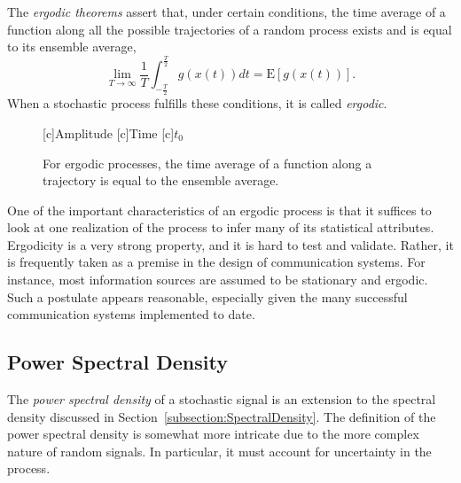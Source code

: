 \begin{definition}[Ergodicity]
The \emph{ergodic theorems} assert that, under certain conditions, the time average of a function along all the possible trajectories of a random process exists and is equal to its ensemble average,
\begin{equation*}
\lim_{T \rightarrow \infty} \frac{1}{T} \int_{- \frac{T}{2}}^{\frac{T}{2}} g(x(t)) dt
= \mathrm{E}[g(x(t))] .
\end{equation*}
When a stochastic process fulfills these conditions, it is called \emph{ergodic}.
\end{definition}

\begin{figure}[htbp]
\begin{center}
\begin{psfrags}
[c]{Amplitude}
[c]{Time}
[c]{$t_0$}
\end{psfrags}
\caption{For ergodic processes, the time average of a function along a trajectory is equal to the ensemble average.}
\label{figure:ErgodicProcess}
\end{center}
\end{figure}

One of the important characteristics of an ergodic process is that it suffices to look at one realization of the process to infer many of its statistical attributes.
Ergodicity is a very strong property, and it is hard to test and validate.
Rather, it is frequently taken as a premise in the design of communication systems.
For instance, most information sources are assumed to be stationary and ergodic.
Such a postulate appears reasonable, especially given the many successful communication systems implemented to date.


\subsection{Power Spectral Density}

The \emph{power spectral density} of a stochastic signal is an extension to the spectral density discussed in Section~\ref{subsection:SpectralDensity}.
The definition of the power spectral density is somewhat more intricate due to the more complex nature of random signals.
In particular, it must account for uncertainty in the process.

